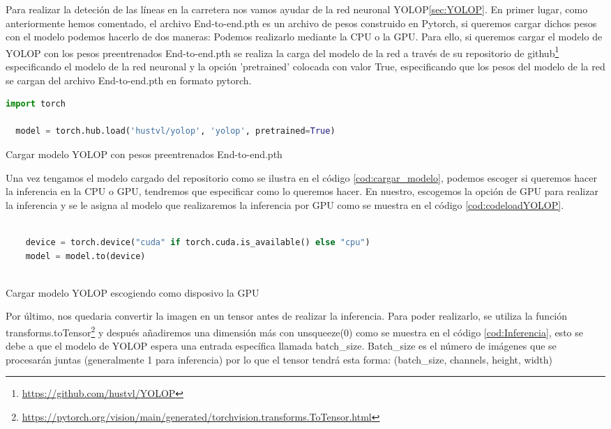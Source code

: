 Para realizar la deteción de las líneas en la carretera nos vamos ayudar de la red neuronal YOLOP\ref{sec:YOLOP}. En primer lugar, 
como anteriormente hemos comentado, el archivo End-to-end.pth es un archivo de pesos construido en Pytorch, si queremos cargar
dichos pesos con el modelo podemos hacerlo de dos maneras: Podemos realizarlo mediante la CPU o la GPU. 
Para ello, si queremos cargar el modelo de YOLOP con los pesos preentrenados End-to-end.pth se realiza la carga del modelo de la red a través de su repositorio de github\footnote{\url{https://github.com/hustvl/YOLOP}}
especificando el modelo de la red neuronal y la opción 'pretrained' colocada con valor True, especificando que los pesos del modelo de la red se cargan del archivo End-to-end.pth en formato pytorch.\newline
\begin{code}[h]
  \begin{lstlisting}[language=Python]
  import torch
  
  model = torch.hub.load('hustvl/yolop', 'yolop', pretrained=True)

  \end{lstlisting}
  \caption[Cargar modelo YOLOP con pesos preentrenados End-to-end.pth]{Cargar modelo YOLOP con pesos preentrenados End-to-end.pth}
  \label{cod:cargar_modelo}
  \end{code}  

Una vez tengamos el modelo cargado del repositorio como se ilustra en el código \ref{cod:cargar_modelo}, podemos escoger si queremos hacer la inferencia en la CPU o GPU, tendremos que especificar como 
lo queremos hacer. En nuestro, escogemos la opción de GPU para realizar la inferencia y se le asigna al modelo que realizaremos la inferencia por GPU 
como se muestra en el código \ref{cod:codeloadYOLOP}.\newline

  
  \begin{code}[h]
    \begin{lstlisting}[language=Python]
   
    device = torch.device("cuda" if torch.cuda.is_available() else "cpu")
    model = model.to(device)
  
    \end{lstlisting}
    \caption[Cargar modelo YOLOP escogiendo como disposivo la GPU]{Cargar modelo YOLOP escogiendo como disposivo la GPU}
    \label{cod:codeloadYOLOP}
    \end{code}  

    Por último, nos quedaria convertir la imagen en un tensor antes de realizar la inferencia. Para poder realizarlo, se utiliza la función transforms.toTensor\footnote{\url{https://pytorch.org/vision/main/generated/torchvision.transforms.ToTensor.html}} 
    y después añadiremos una dimensión más con unsqueeze(0) como se muestra en el código \ref{cod:Inferencia}, esto se debe 
    a que el modelo de YOLOP espera una entrada específica llamada batch\_size. Batch\_size es el número de imágenes que se procesarán juntas
    (generalmente 1 para inferencia) por lo que el tensor tendrá esta forma: (batch\_size, channels, height, width)\newline

